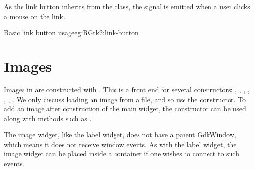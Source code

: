 As the link button inherits from the  class, the
 signal is emitted when a user clicks a mouse on the link.

\begin{example}{Basic link button usage}{eg:RGtk2:link-button}
\begin{Schunk}
\end{Schunk}
\end{example}


\section{Images}
\label{sec:RGtk2:images}

Images in  are constructed with
. This is a front end for several constructors:
,
,
, ,
,
,
. We only discuss loading an
image from a file, and so use the 
constructor. To add an image after construction of the main widget,
the  constructor can be used along with
methods such as .

The image widget, like the label widget, does not have a parent
GdkWindow, which means it does not receive window events. As with the
label widget, the image widget can be placed inside a
 container if one wishes to connect to such
events.



